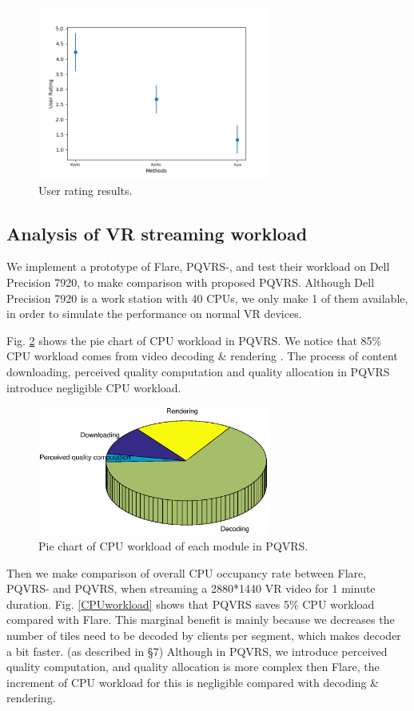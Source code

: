     \begin{figure}
  \centering
  \includegraphics[width=3in]{images/rating_result.png}
  \caption{User rating results.}
  \label{rating_res}
  \end{figure}

\subsection{Analysis of VR streaming workload}

We implement a prototype of Flare, PQVRS-, and test their workload on Dell Precision 7920, to make comparison with proposed PQVRS. Although Dell Precision 7920 is a work station with 40 CPUs, we only make 1 of them available, in order to simulate the performance on normal VR devices.

Fig. \ref{pie_chart} shows the pie chart of CPU workload in PQVRS. We notice that 85\% CPU workload comes from video decoding \& rendering . The process of content downloading, perceived quality computation and quality allocation in PQVRS introduce negligible CPU workload.

    \begin{figure}
  \centering
  \includegraphics[width=3in]{images/piechart.eps}
  \caption{Pie chart of CPU workload of each module in PQVRS.}
  \label{pie_chart}
  \end{figure}

Then we make comparison of overall CPU occupancy rate between Flare, PQVRS- and PQVRS, when streaming a 2880*1440 VR video for 1 minute duration. Fig. \ref{CPUworkload} shows that PQVRS saves 5\% CPU workload compared with Flare. This marginal benefit is mainly because we decreases the number of tiles need to be decoded by clients per segment, which makes decoder a bit faster. (as described in \S 7) Although in PQVRS, we introduce perceived quality computation, and quality allocation is more complex then Flare, the increment of CPU workload for this is negligible compared with decoding \& rendering.

